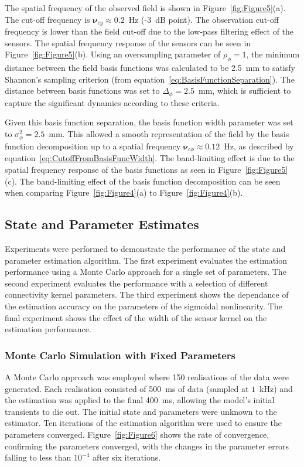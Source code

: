 \documentclass[12pt]{iopart}
\begin{document}
The spatial frequency of the observed field is shown in Figure~\ref{fig:Figure5}(a). The cut-off frequency is $\boldsymbol{\nu}_{cy} \approx 0.2$~Hz (-3~dB point). The observation cut-off frequency is lower than the field cut-off due to the low-pass filtering effect of the sensors. The spatial frequency response of the sensors can be seen in Figure~\ref{fig:Figure5}(b). Using an oversampling parameter of $\rho_{\phi}=1$, the minimum distance between the field basis functions was calculated to be 2.5~mm to satisfy Shannon's sampling criterion (from equation~\ref{eq:BasisFunctionSeparation}). The distance between basis functions was set to $\Delta_{\phi}=2.5$~mm, which is sufficient to capture the significant dynamics according to these criteria.

Given this basis function separation, the basis function width parameter was set to $\sigma_{\phi}^2=2.5$~mm. This allowed a smooth representation of the field by the basis function decomposition up to a spatial frequency $\boldsymbol{\nu}_{c\phi} \approx 0.12$~Hz, as described by equation~\ref{eq:CutoffFromBasisFuncWidth}. The band-limiting effect is due to the spatial frequency response of the basis functions as seen in Figure~\ref{fig:Figure5}(c). The band-limiting effect of the basis function decomposition can be seen when comparing Figure~\ref{fig:Figure4}(a) to Figure~\ref{fig:Figure4}(b).

\subsection{State and Parameter Estimates} 
\label{sec:state_and_param_results}
Experiments were performed to demonstrate the performance of the state and parameter estimation algorithm. The first experiment evaluates the estimation performance using a Monte Carlo approach for a single set of parameters. The second experiment evaluates the performance with a selection of different connectivity kernel parameters. The third experiment shows the dependance of the estimation accuracy on the parameters of the sigmoidal nonlinearity. The final experiment shows the effect of the width of the sensor kernel on the estimation performance.

\subsubsection{Monte Carlo Simulation with Fixed Parameters}
A Monte Carlo approach was employed where 150 realisations of the data were generated. Each realisation consisted of 500~ms of data (sampled at $1$~kHz) and the estimation was applied to the final 400~ms, allowing the model's initial transients to die out. The initial state and parameters were unknown to the estimator. Ten iterations of the estimation algorithm were used to ensure the parameters converged. Figure~\ref{fig:Figure6} shows the rate of convergence, confirming the parameters converged, with the changes in the parameter errors falling to less than $10^{-4}$ after six iterations.
\end{document}
